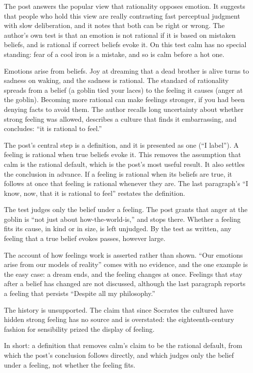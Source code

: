\begin{afterword}
\summaryhead

The post answers the popular view that rationality opposes emotion. It suggests that people who hold this view are really contrasting fast perceptual judgment with slow deliberation, and it notes that both can be right or wrong. The author's own test is that an emotion is not rational if it is based on mistaken beliefs, and is rational if correct beliefs evoke it. On this test calm has no special standing: fear of a cool iron is a mistake, and so is calm before a hot one.

Emotions arise from beliefs. Joy at dreaming that a dead brother is alive turns to sadness on waking, and the sadness is rational. The standard of rationality spreads from a belief (a goblin tied your laces) to the feeling it causes (anger at the goblin). Becoming more rational can make feelings stronger, if you had been denying facts to avoid them. The author recalls long uncertainty about whether strong feeling was allowed, describes a culture that finds it embarrassing, and concludes: ``it is rational to feel.''

\responsehead

The post's central step is a definition, and it is presented as one (``I label''). A feeling is rational when true beliefs evoke it. This removes the assumption that calm is the rational default, which is the post's most useful result. It also settles the conclusion in advance. If a feeling is rational when its beliefs are true, it follows at once that feeling is rational whenever they are. The last paragraph's ``I know, now, that it is rational to feel'' restates the definition.

The test judges only the belief under a feeling. The post grants that anger at the goblin is ``not just about how-the-world-is,'' and stops there. Whether a feeling fits its cause, in kind or in size, is left unjudged. By the test as written, any feeling that a true belief evokes passes, however large.

The account of how feelings work is asserted rather than shown. ``Our emotions arise from our models of reality'' comes with no evidence, and the one example is the easy case: a dream ends, and the feeling changes at once. Feelings that stay after a belief has changed are not discussed, although the last paragraph reports a feeling that persists ``Despite all my philosophy.''

The history is unsupported. The claim that since Socrates the cultured have hidden strong feeling has no source and is overstated: the eighteenth-century fashion for sensibility prized the display of feeling.

In short: a definition that removes calm's claim to be the rational default, from which the post's conclusion follows directly, and which judges only the belief under a feeling, not whether the feeling fits.
\end{afterword}
